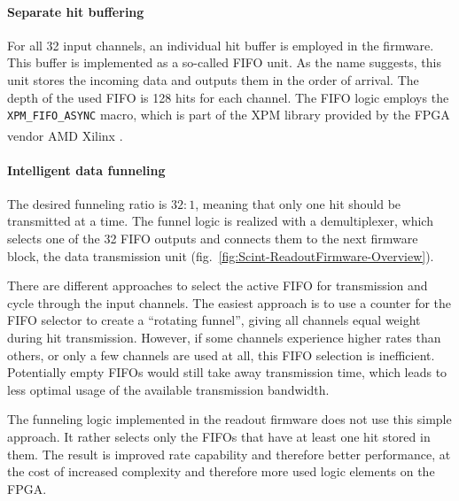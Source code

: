 \paragraph{Separate hit buffering}
For all 32 input channels, an individual hit buffer is employed in the firmware. This buffer is implemented as a so-called \ac{FIFO} unit. As the name suggests, this unit stores the incoming data and outputs them in the order of arrival. The depth of the used \ac{FIFO} is 128 hits for each channel. The \ac{FIFO} logic employs the \texttt{XPM\_FIFO\_ASYNC} macro, which is part of the \ac{XPM} library provided by the \ac{FPGA} vendor AMD\textsuperscript{\texttrademark} Xilinx \cite{Xilinx-XPM}.
\paragraph{Intelligent data funneling}
The desired funneling ratio is $32:1$, meaning that only one hit should be transmitted at a time. The funnel logic is realized with a demultiplexer, which selects one of the 32 \ac{FIFO} outputs and connects them to the next firmware block, the data transmission unit (fig.\ \ref{fig:Scint-ReadoutFirmware-Overview}).
\par There are different approaches to select the active \ac{FIFO} for transmission and cycle through the input channels. The easiest approach is to use a counter for the \ac{FIFO} selector to create a \enquote{rotating funnel}, giving all channels equal weight during hit transmission. However, if some channels experience higher rates than others, or only a few channels are used at all, this \ac{FIFO} selection is inefficient. Potentially empty \acp{FIFO} would still take away transmission time, which leads to less optimal usage of the available transmission bandwidth.
\par The funneling logic implemented in the readout firmware does not use this simple approach. It rather selects only the \acp{FIFO} that have at least one hit stored in them. The result is improved rate capability and therefore better performance, at the cost of increased complexity and therefore more used logic elements on the \ac{FPGA}.





\FloatBarrier
